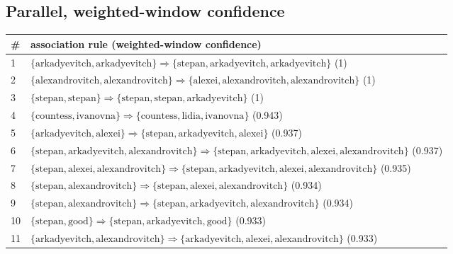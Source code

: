 \begin{appendices}
\section{Parallel, weighted-window confidence}

\begin{longtable}{p{20pt}|p{\dimexpr\textwidth-20pt-\tabcolsep\relax}}
\# & association rule (weighted-window confidence) \\
\hline
1 & $ \{ \text{arkadyevitch},\allowbreak\text{arkadyevitch} \} \Rightarrow \{ \text{stepan},\allowbreak\text{arkadyevitch},\allowbreak\text{arkadyevitch} \} $ (1) \\
2 & $ \{ \text{alexandrovitch},\allowbreak\text{alexandrovitch} \} \Rightarrow \{ \text{alexei},\allowbreak\text{alexandrovitch},\allowbreak\text{alexandrovitch} \} $ (1) \\
3 & $ \{ \text{stepan},\allowbreak\text{stepan} \} \Rightarrow \{ \text{stepan},\allowbreak\text{stepan},\allowbreak\text{arkadyevitch} \} $ (1) \\
4 & $ \{ \text{countess},\allowbreak\text{ivanovna} \} \Rightarrow \{ \text{countess},\allowbreak\text{lidia},\allowbreak\text{ivanovna} \} $ (0.943) \\
5 & $ \{ \text{arkadyevitch},\allowbreak\text{alexei} \} \Rightarrow \{ \text{stepan},\allowbreak\text{arkadyevitch},\allowbreak\text{alexei} \} $ (0.937) \\
6 & $ \{ \text{stepan},\allowbreak\text{arkadyevitch},\allowbreak\text{alexandrovitch} \} \Rightarrow \{ \text{stepan},\allowbreak\text{arkadyevitch},\allowbreak\text{alexei},\allowbreak\text{alexandrovitch} \} $ (0.937) \\
7 & $ \{ \text{stepan},\allowbreak\text{alexei},\allowbreak\text{alexandrovitch} \} \Rightarrow \{ \text{stepan},\allowbreak\text{arkadyevitch},\allowbreak\text{alexei},\allowbreak\text{alexandrovitch} \} $ (0.935) \\
8 & $ \{ \text{stepan},\allowbreak\text{alexandrovitch} \} \Rightarrow \{ \text{stepan},\allowbreak\text{alexei},\allowbreak\text{alexandrovitch} \} $ (0.934) \\
9 & $ \{ \text{stepan},\allowbreak\text{alexandrovitch} \} \Rightarrow \{ \text{stepan},\allowbreak\text{arkadyevitch},\allowbreak\text{alexandrovitch} \} $ (0.934) \\
10 & $ \{ \text{stepan},\allowbreak\text{good} \} \Rightarrow \{ \text{stepan},\allowbreak\text{arkadyevitch},\allowbreak\text{good} \} $ (0.933) \\
11 & $ \{ \text{arkadyevitch},\allowbreak\text{alexandrovitch} \} \Rightarrow \{ \text{arkadyevitch},\allowbreak\text{alexei},\allowbreak\text{alexandrovitch} \} $ (0.933) \\

\end{longtable}
\end{appendices}
